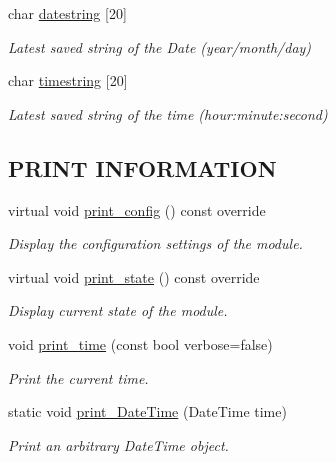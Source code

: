 \begin{DoxyCompactItemize}
char \hyperlink{class_loom_r_t_c_a86d3babf565f32bcbdffcf6e2a5efcdd}{datestring} \mbox{[}20\mbox{]}
\begin{DoxyCompactList}\small\item\em Latest saved string of the Date (year/month/day) \end{DoxyCompactList}\item 
char \hyperlink{class_loom_r_t_c_a30e77eaeb4b0e25c8fde9239e64fe13a}{timestring} \mbox{[}20\mbox{]}
\begin{DoxyCompactList}\small\item\em Latest saved string of the time (hour\+:minute\+:second) \end{DoxyCompactList}\end{DoxyCompactItemize}
\subsection*{P\+R\+I\+NT I\+N\+F\+O\+R\+M\+A\+T\+I\+ON}
\begin{DoxyCompactItemize}
\item 
virtual void \hyperlink{class_loom_r_t_c_a41c84de7ef49bf7f42069f948a98c30b}{print\+\_\+config} () const override
\begin{DoxyCompactList}\small\item\em Display the configuration settings of the module. \end{DoxyCompactList}\item 
virtual void \hyperlink{class_loom_r_t_c_aaa45a542cfd7b64f79a2c321a29c08f5}{print\+\_\+state} () const override
\begin{DoxyCompactList}\small\item\em Display current state of the module. \end{DoxyCompactList}\item 
void \hyperlink{class_loom_r_t_c_afa1dcbf39c103215fbc41313c09294d2}{print\+\_\+time} (const bool verbose=false)
\begin{DoxyCompactList}\small\item\em Print the current time. \end{DoxyCompactList}\item 
static void \hyperlink{class_loom_r_t_c_a4114a95d1dbc89e3ea8e3f27b3250108}{print\+\_\+\+Date\+Time} (Date\+Time time)
\begin{DoxyCompactList}\small\item\em Print an arbitrary Date\+Time object. \end{DoxyCompactList}\end{DoxyCompactItemize}
